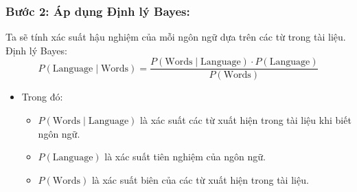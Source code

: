 \begin{itemize}
        \subsubsection{ Bước 2: Áp dụng Định lý Bayes:}
        Ta sẽ tính xác suất hậu nghiệm của mỗi ngôn ngữ dựa trên các từ trong tài liệu. Định lý Bayes:
        \[P(\text{Language} \mid \text{Words}) = \frac{P(\text{Words} \mid \text{Language}) \cdot P(\text{Language})}{P(\text{Words})}\]
        \begin{itemize}
            \item Trong đó:
        \begin{itemize}
            \item \(P(\text{Words} \mid \text{Language})\) là xác suất các từ xuất hiện trong tài liệu khi biết ngôn ngữ.
            \item \(P(\text{Language})\) là xác suất tiên nghiệm của ngôn ngữ.
            \item \(P(\text{Words})\) là xác suất biên của các từ xuất hiện trong tài liệu.
        \end{itemize}     
        \end{itemize}

\end{itemize}
